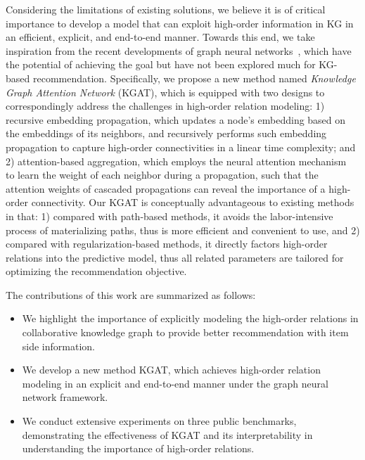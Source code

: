 \documentclass[sigconf]{acmart}
\theoremstyle{definition}
\begin{document}
Considering the limitations of existing solutions, we believe it is of critical importance to develop a model that can exploit high-order information in KG in an efficient, explicit, and end-to-end manner. Towards this end, we take inspiration from the recent developments of 
graph neural networks~\cite{GCN,GraphSage,GAT}, which have the potential of achieving the goal but have not been explored much for KG-based recommendation. 
Specifically, we propose a new method named \textit{Knowledge Graph Attention Network} (KGAT), which is equipped with two designs to correspondingly address the challenges in high-order relation modeling:
1) recursive embedding propagation, which updates a node's embedding based on the embeddings of its neighbors, and recursively performs such embedding propagation to capture high-order connectivities in a linear time complexity; and 
2) attention-based aggregation, which employs the neural attention mechanism~\cite{Attention,ACF} to learn the weight of each neighbor during a propagation, such that the attention weights of cascaded propagations can reveal the importance of a high-order connectivity.
Our KGAT is conceptually advantageous to existing methods in that: 1) compared with path-based methods, it avoids the labor-intensive process of materializing paths, thus is more efficient and convenient to use, and 2) compared with regularization-based methods, it directly factors high-order relations into the predictive model, thus all related parameters are tailored for optimizing the recommendation objective. 

The contributions of this work are summarized as follows:
\begin{itemize}[leftmargin=*]
    \item We highlight the importance of explicitly modeling the high-order relations in collaborative knowledge graph to provide better recommendation with item side information. 
\item We develop a new method KGAT, which achieves high-order relation modeling in an explicit and end-to-end manner under the graph neural network framework. 
\item We conduct extensive experiments on three public benchmarks, demonstrating the effectiveness of KGAT and its interpretability in understanding the importance of high-order relations. 


\end{itemize}
\end{document}
